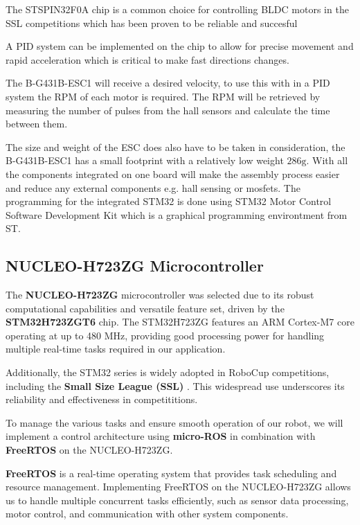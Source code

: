 \documentclass[a4paper,12pt]{article}
\begin{document}
  The STSPIN32F0A chip is a common choice for controlling BLDC motors in
  the SSL competitions which has been proven to be reliable and
  succesful
  \cite{ryllExtendedTeamDescription}\cite{abousaleh2024TeamDescription}

  A PID system can be implemented on the chip to allow for precise
  movement and rapid acceleration which is critical to make fast
  directions changes.

  The B-G431B-ESC1 will receive a desired velocity, to use this with in
  a PID system the RPM of each motor is required. The RPM will be
  retrieved by measuring the number of pulses from the hall sensors and
  calculate the time between them.

  The size and weight of the ESC does also have to be taken in
  consideration, the B-G431B-ESC1 has a small footprint with a
  relatively low weight $286\text{g}$. With all the components
  integrated on one board will make the assembly process easier and
  reduce any external components e.g. hall sensing or mosfets. The
  programming for the integrated STM32 is done using STM32 Motor Control
  Software Development Kit which is a graphical programming environtment
  from ST.

  \subsection*{NUCLEO-H723ZG Microcontroller}

  The \textbf{NUCLEO-H723ZG} microcontroller was selected due to its
  robust computational capabilities and versatile feature set, driven by
  the \textbf{STM32H723ZGT6} chip. The STM32H723ZG features an ARM
  Cortex-M7 core operating at up to 480 MHz, providing good processing
  power for handling multiple real-time tasks required in our
  application.

  Additionally, the STM32 series is widely adopted in RoboCup
  competitions, including the \textbf{Small Size League (SSL)} \cite{ryllExtendedTeamDescription}\cite{zhaoZJUNlictExtendedTeam}\cite{wuCompilationErrorTeam}.
  This widespread use underscores its reliability and effectiveness in
  competititions.

  To manage the various tasks and ensure smooth operation of our robot,
  we will implement a control architecture using \textbf{micro-ROS} in
  combination with \textbf{FreeRTOS} on the NUCLEO-H723ZG.

  \textbf{FreeRTOS} is a real-time operating system that provides task
  scheduling and resource management. Implementing FreeRTOS on the
  NUCLEO-H723ZG allows us to handle multiple concurrent tasks
  efficiently, such as sensor data processing, motor control, and
  communication with other system components.
\end{document}
